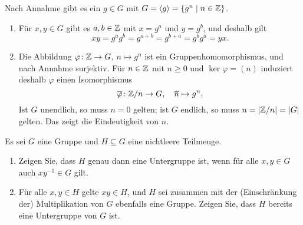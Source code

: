 \begin{solution}
  \label{question: classification of cyclic groups}
  Nach Annahme gibt es ein $g \in G$ mit $G = \langle g\rangle = \{g^n \mid n \in \mathbb{Z}\}$.
  \begin{enumerate}
    \item
      Für $x, y \in G$ gibt es $a, b \in \mathbb{Z}$ mit $x = g^a$ und $y = g^b$, und deshalb gilt
      \[
        xy = g^a g^b = g^{a+b} = g^{b+a} = g^b g^a = yx.
      \]
      
    \item
      Die Abbildung $\varphi \colon \mathbb{Z} \to G$, $n \mapsto g^n$ ist ein Gruppenhomomorphismus, und nach Annahme surjektiv.
      Für $n \in \mathbb{Z}$ mit $n \geq 0$ und $\ker \varphi = (n)$ induziert deshalb $\varphi$ einen Isomorphismus
      \[
        \overline{\varphi} \colon \mathbb{Z}/n \to G,
        \quad
        \overline{n} \mapsto g^n.
      \]
      Ist $G$ unendlich, so muss $n = 0$ gelten;
      ist $G$ endlich, so muss $n = |\mathbb{Z}/n| = |G|$ gelten.
      Das zeigt die Eindeutigkeit von $n$.
  \end{enumerate}
\end{solution}


\begin{question}[subtitle = Zur Definition von Untergruppen]
  Es sei $G$ eine Gruppe und $H \subseteq G$ eine nichtleere Teilmenge.
  \begin{enumerate}
    \item
      Zeigen Sie, dass $H$ genau dann eine Untergruppe ist, wenn für alle $x, y \in G$ auch $x y^{-1} \in G$ gilt.
    \item
      Für alle $x, y \in H$ gelte $xy \in H$, und $H$ sei zusammen mit der (Einschränkung der) Multiplikation von $G$ ebenfalls eine Gruppe.
      Zeigen Sie, dass $H$ bereits eine Untergruppe von $G$ ist.
  \end{enumerate}
\end{question}


